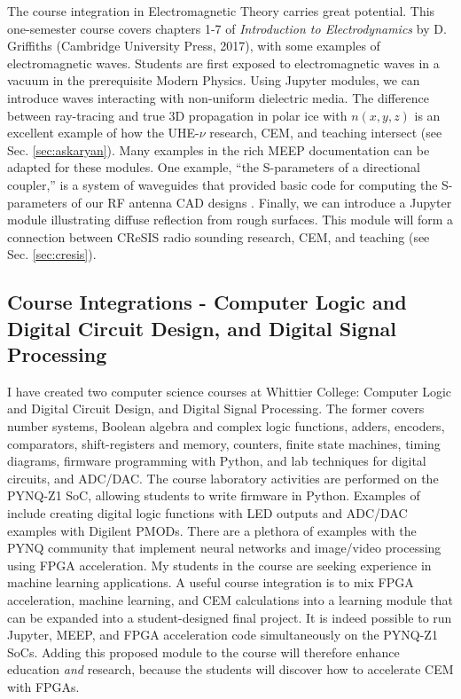 \documentclass[../../main.tex]{subfiles}
\begin{document}
The course integration in Electromagnetic Theory carries great potential.  This one-semester course covers chapters 1-7 of \textit{Introduction to Electrodynamics} by D. Griffiths (Cambridge University Press, 2017), with some examples of electromagnetic waves.  Students are first exposed to electromagnetic waves in a vacuum in the prerequisite Modern Physics.  Using Jupyter modules, we can introduce waves interacting with non-uniform dielectric media.  The difference between ray-tracing and true 3D propagation in polar ice with $n(x,y,z)$ is an excellent example of how the UHE-$\nu$ research, CEM, and teaching intersect (see Sec. \ref{sec:askaryan}).  Many examples in the rich MEEP documentation can be adapted for these modules.  One example, ``the S-parameters of a directional coupler,'' is a system of waveguides that provided basic code for computing the S-parameters of our RF antenna CAD designs \cite{meepcon2022}.  Finally, we can introduce a Jupyter module illustrating diffuse reflection from rough surfaces.  This module will form a connection between CReSIS radio sounding research, CEM, and teaching (see Sec. \ref{sec:cresis}).  \\ \vspace{2.5mm}

\subsection{Course Integrations - Computer Logic and Digital Circuit Design, and Digital Signal Processing}

I have created two computer science courses at Whittier College: Computer Logic and Digital Circuit Design, and Digital Signal Processing.  The former covers number systems, Boolean algebra and complex logic functions, adders, encoders, comparators, shift-registers and memory, counters, finite state machines, timing diagrams, firmware programming with Python, and lab techniques for digital circuits, and ADC/DAC.  The course laboratory activities are performed on the PYNQ-Z1 SoC, allowing students to write firmware in Python.  Examples of include creating digital logic functions with LED outputs and ADC/DAC examples with Digilent PMODs.  There are a plethora of examples with the PYNQ community that implement neural networks and image/video processing using FPGA acceleration.  My students in the course are seeking experience in machine learning applications.  A useful course integration is to mix FPGA acceleration, machine learning, and CEM calculations into a learning module that can be expanded into a student-designed final project.  It is indeed possible to run Jupyter, MEEP, and FPGA acceleration code simultaneously on the PYNQ-Z1 SoCs.  Adding this proposed module to the course will therefore enhance education \textit{and} research, because the students will discover how to accelerate CEM with FPGAs.  \\ \vspace{2.5mm}
\end{document}
